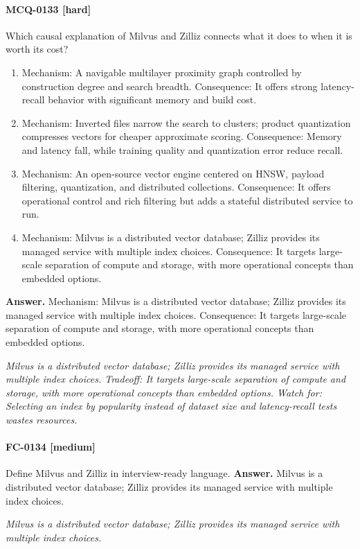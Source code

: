 \paragraph{MCQ-0133 [hard]} Which causal explanation of Milvus and Zilliz connects what it does to when it is worth its cost?
\begin{enumerate}[label=\Alph*.]
\item Mechanism: A navigable multilayer proximity graph controlled by construction degree and search breadth. Consequence: It offers strong latency-recall behavior with significant memory and build cost.
\item Mechanism: Inverted files narrow the search to clusters; product quantization compresses vectors for cheaper approximate scoring. Consequence: Memory and latency fall, while training quality and quantization error reduce recall.
\item Mechanism: An open-source vector engine centered on HNSW, payload filtering, quantization, and distributed collections. Consequence: It offers operational control and rich filtering but adds a stateful distributed service to run.
\item Mechanism: Milvus is a distributed vector database; Zilliz provides its managed service with multiple index choices. Consequence: It targets large-scale separation of compute and storage, with more operational concepts than embedded options.
\end{enumerate}
\noindent\textbf{Answer.} Mechanism: Milvus is a distributed vector database; Zilliz provides its managed service with multiple index choices. Consequence: It targets large-scale separation of compute and storage, with more operational concepts than embedded options.
\par\textit{Milvus is a distributed vector database; Zilliz provides its managed service with multiple index choices. Tradeoff: It targets large-scale separation of compute and storage, with more operational concepts than embedded options. Watch for: Selecting an index by popularity instead of dataset size and latency-recall tests wastes resources.}
\paragraph{FC-0134 [medium]} Define Milvus and Zilliz in interview-ready language.
\noindent\textbf{Answer.} Milvus is a distributed vector database; Zilliz provides its managed service with multiple index choices.
\par\textit{Milvus is a distributed vector database; Zilliz provides its managed service with multiple index choices.}
